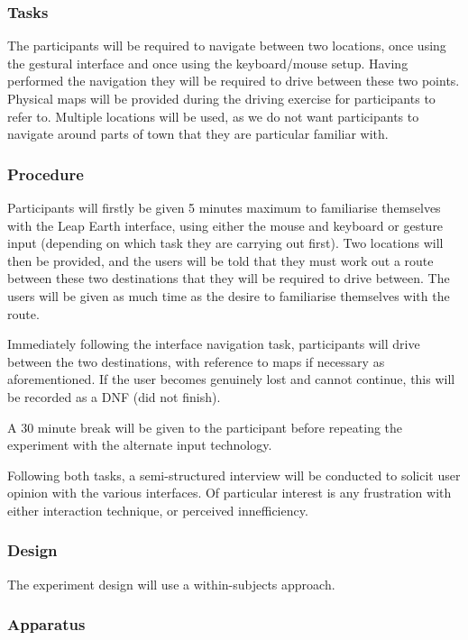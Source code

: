 \documentclass{sigplanconf}
\begin{document}
\subsubsection{Tasks}

The participants will be required to navigate between two locations, once using the gestural interface and once using the keyboard/mouse setup. Having performed the navigation they will be required to drive between these two points. Physical maps will be provided during the driving exercise for participants to refer to. Multiple locations will be used, as we do not want participants to navigate around parts of town that they are particular familiar with.

\subsubsection{Procedure}

Participants will firstly be given 5 minutes maximum to familiarise themselves with the Leap Earth interface, using either the mouse and keyboard or gesture input (depending on which task they are carrying out first). Two locations will then be provided, and the users will be told that they must work out a route between these two destinations that they will be required to drive between. The users will be given as much time as the desire to familiarise themselves with the route. 

Immediately following the interface navigation task, participants will drive between the two destinations, with reference to maps if necessary as aforementioned. If the user becomes genuinely lost and cannot continue, this will be recorded as a DNF (did not finish).

A 30 minute break will be given to the participant before repeating the experiment with the alternate input technology.

Following both tasks, a semi-structured interview will be conducted to solicit user opinion with the various interfaces. Of particular interest is any frustration with either interaction technique, or perceived innefficiency.

\subsubsection{Design}

The experiment design will use a within-subjects approach.

\subsubsection{Apparatus}
\end{document}
